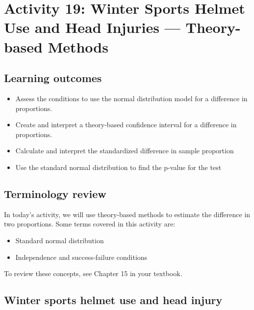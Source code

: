 \documentclass[
]{report}
\begin{document}
\vspace{1in}

\newpage

\section{Activity 19: Winter Sports Helmet Use and Head Injuries --- Theory-based Methods}\label{activity-19-winter-sports-helmet-use-and-head-injuries-theory-based-methods}


\subsection{Learning outcomes}\label{learning-outcomes-20}

\begin{itemize}
\item
  Assess the conditions to use the normal distribution model for a difference in proportions.
\item
  Create and interpret a theory-based confidence interval for a difference in proportions.
\item
  Calculate and interpret the standardized difference in sample proportion
\item
  Use the standard normal distribution to find the p-value for the test
\end{itemize}

\subsection{Terminology review}\label{terminology-review-17}

In today's activity, we will use theory-based methods to estimate the difference in two proportions. Some terms covered in this activity are:

\begin{itemize}
\item
  Standard normal distribution
\item
  Independence and success-failure conditions
\end{itemize}

To review these concepts, see Chapter 15 in your textbook.

\subsection{Winter sports helmet use and head injury}\label{winter-sports-helmet-use-and-head-injury}
\end{document}
